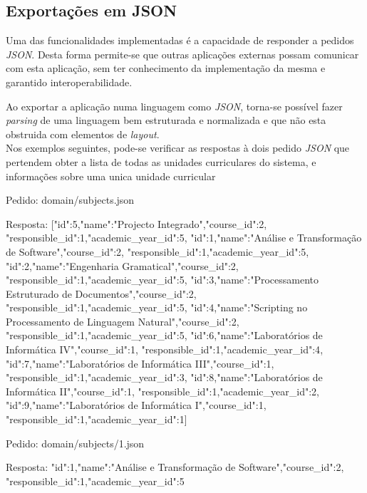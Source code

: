 \subsection{Exportações em JSON}

Uma das funcionalidades implementadas é a capacidade de responder a pedidos \textit{JSON}. Desta forma permite-se que outras aplicações externas possam comunicar com esta aplicação, sem ter conhecimento da implementação da mesma e garantido interoperabilidade.

Ao exportar a aplicação numa linguagem como \textit{JSON}, torna-se possível fazer \textit{parsing} de uma linguagem bem estruturada e normalizada e que não esta obstruida com elementos de \textit{layout}.\\

Nos exemplos seguintes, pode-se verificar as respostas à dois pedido \textit{JSON} que pertendem obter a lista de todas as unidades curriculares do sistema, e informações sobre uma unica unidade curricular

\begin{spverbatim}
	Pedido:
	domain/subjects.json

	Resposta:
	[{"id":5,"name":"Projecto Integrado","course_id":2,
	"responsible_id":1,"academic_year_id":5},
	{"id":1,"name":"Análise e Transformação de Software","course_id":2,
	"responsible_id":1,"academic_year_id":5},
	{"id":2,"name":"Engenharia Gramatical","course_id":2,
	"responsible_id":1,"academic_year_id":5},
	{"id":3,"name":"Processamento Estruturado de Documentos","course_id":2,
	"responsible_id":1,"academic_year_id":5},
	{"id":4,"name":"Scripting no Processamento de Linguagem Natural","course_id":2,
	"responsible_id":1,"academic_year_id":5},
	{"id":6,"name":"Laboratórios de Informática IV","course_id":1,
	"responsible_id":1,"academic_year_id":4},
	{"id":7,"name":"Laboratórios de Informática III","course_id":1,
	"responsible_id":1,"academic_year_id":3},
	{"id":8,"name":"Laboratórios de Informática II","course_id":1,
	"responsible_id":1,"academic_year_id":2},
	{"id":9,"name":"Laboratórios de Informática I","course_id":1,
	"responsible_id":1,"academic_year_id":1}]
\end{spverbatim}

\begin{spverbatim}
	Pedido:
	domain/subjects/1.json

	Resposta:
	{"id":1,"name":"Análise e Transformação de Software","course_id":2,
	"responsible_id":1,"academic_year_id":5}
\end{spverbatim}
